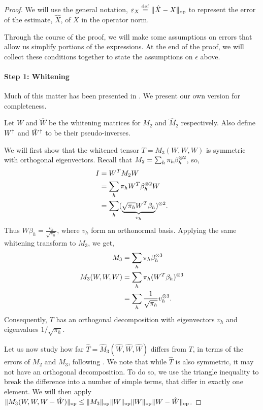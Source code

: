 \begin{proof}
We will use the general notation, $\varepsilon_{X} \stackrel{\rm def}{=} \|\hat X - X\|_{\textrm{op}}$
to represent the error of the estimate, $\hat X$, of $X$ in the operator
norm. 

Through the course of the proof, we will make some assumptions on errors
that allow us simplify portions of the expressions. At the end of
the proof, we will collect these conditions together to state the
assumptions on $\epsilon$ above.

\paragraph{Step 1: Whitening}
Much of this matter has been presented in \citet[Lemma 11, 12]{hsu13spherical}. We present our own version for completeness.

Let $W$ and $\hat W$ be the whitening matrices for $M_2$ and $\hat M_2$
respectively. Also define $W^{\dagger}$ and ${\hat W}^{\dagger}$ to be their
pseudo-inverses.

We will first show that the whitened tensor $T = M_3(W,W,W)$ is symmetric with orthogonal
eigenvectors. Recall that $M_2 = \sum_h \pi_h \beta_h^{\otimes 2}$, so,
\begin{align*}
  I 
    &= W^T M_2 W\\
    &= \sum_h \pi_h W^T \beta_h^{\otimes 2} W\\
    &= \sum_h (\underbrace{\sqrt{\pi_h} W^T \beta_h}_{v_h})^{\otimes 2}.
\end{align*}
Thus $W \beta_h = \frac{v_h}{\sqrt{\pi_h}}$,
where $v_h$ form an orthonormal
basis. Applying the same whitening transform to $M_3$, we get, 
\begin{align*}
  M_3 &= \sum_h \pi_h \beta_h^{\otimes 3} \\
  M_3(W,W,W) &= \sum_h \pi_h (W^T \beta_h)^{\otimes 3} \\
  &= \sum_h \frac{1}{\sqrt{\pi_h}} v_h^{\otimes 3}.
\end{align*}
Consequently, $T$ has an orthogonal decomposition with eigenvectors $v_h$ and eigenvalues $1/\sqrt{\pi_h}$.

Let us now study how far $\hat T = \hat M_3(\hat W, \hat W, \hat W)$ differs from $T$, in terms of the
errors of $M_2$ and $M_3$, following \citet{AnandkumarGeHsu2012}. We note that while $\hat T$ is also symmetric, it may not have an orthogonal decomposition. 
To do so, we use the triangle inequality to
break the difference into a number of simple terms, that differ in exactly one element. We will then apply $\|M_3(W,W,W-\hat W)\|_{\text{\rm op}} \le \|M_3\|_{\text{\rm op}} \|W\|_{\text{\rm op}} \|W\|_{\text{\rm op}} \|W - \hat W\|_{\text{\rm op}}$.


\end{proof}
